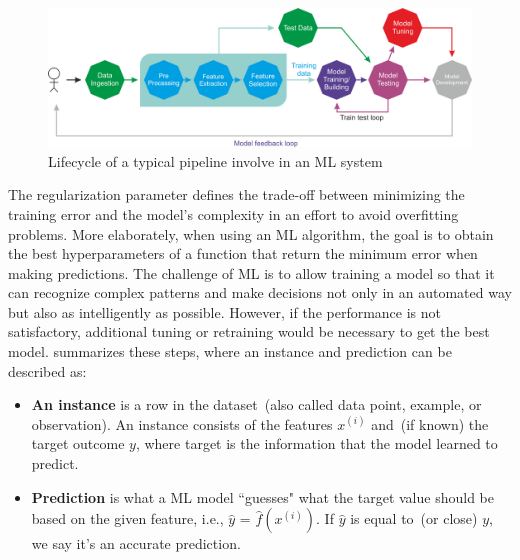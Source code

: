 \begin{figure}[h]
	\centering
	\includegraphics[scale=0.6]{images/B08452_01_02.png}
	\caption[Lifecycle of a typical  pipeline involve in an ML system]{Lifecycle of a typical  pipeline involve in an ML system~\cite{karimScalaML2019}} 
	\label{fig:ml_pipeline}
\end{figure}

\hspace*{3.5mm} The regularization parameter defines the trade-off between minimizing the training error and the model's complexity in an effort to avoid overfitting problems. More elaborately, when using an ML algorithm, the goal is to obtain the best hyperparameters of a function that return the minimum error when making predictions. 
The challenge of ML is to allow training a model so that it can recognize complex patterns and make decisions not only in an automated way but also as intelligently as possible. 
However, if the performance is not satisfactory, additional tuning or retraining would be necessary to get the best model. %
 summarizes these steps, where an instance and prediction can be described as: 

\begin{itemize}[noitemsep]
    \item \textbf{An instance} is a row in the dataset~(also called data point, example, or observation). An instance consists of the features $x^{(i)}$ and~(if known) the target outcome ${y}$, where target is the information that the model learned to predict.

    \item \textbf{Prediction} is what a ML model ``guesses" what the target value should be based on the given feature, i.e., $\hat{y}$ = $\hat{f}\left(x^{(i)}\right)$. If $\hat{y}$ is equal to~(or close) ${y}$, we say it's an accurate prediction.   
\end{itemize}

